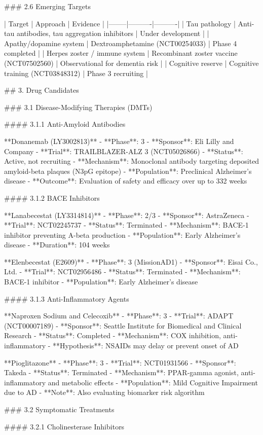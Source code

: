 ### 2.6 Emerging Targets

| Target | Approach | Evidence |
|--------|----------|----------|
| Tau pathology | Anti-tau antibodies, tau aggregation inhibitors | Under development |
| Apathy/dopamine system | Dextroamphetamine (NCT00254033) | Phase 4 completed |
| Herpes zoster / immune system | Recombinant zoster vaccine (NCT07502560) | Observational for dementia risk |
| Cognitive reserve | Cognitive training (NCT03848312) | Phase 3 recruiting |

## 3. Drug Candidates

### 3.1 Disease-Modifying Therapies (DMTs)

#### 3.1.1 Anti-Amyloid Antibodies

**Donanemab (LY3002813)**
- **Phase**: 3
- **Sponsor**: Eli Lilly and Company
- **Trial**: TRAILBLAZER-ALZ 3 (NCT05026866)
- **Status**: Active, not recruiting
- **Mechanism**: Monoclonal antibody targeting deposited amyloid-beta plaques (N3pG epitope)
- **Population**: Preclinical Alzheimer's disease
- **Outcome**: Evaluation of safety and efficacy over up to 332 weeks

#### 3.1.2 BACE Inhibitors

**Lanabecestat (LY3314814)**
- **Phase**: 2/3
- **Sponsor**: AstraZeneca
- **Trial**: NCT02245737
- **Status**: Terminated
- **Mechanism**: BACE-1 inhibitor preventing A-beta production
- **Population**: Early Alzheimer's disease
- **Duration**: 104 weeks

**Elenbecestat (E2609)**
- **Phase**: 3 (MissionAD1)
- **Sponsor**: Eisai Co., Ltd.
- **Trial**: NCT02956486
- **Status**: Terminated
- **Mechanism**: BACE-1 inhibitor
- **Population**: Early Alzheimer's disease

#### 3.1.3 Anti-Inflammatory Agents

**Naproxen Sodium and Celecoxib**
- **Phase**: 3
- **Trial**: ADAPT (NCT00007189)
- **Sponsor**: Seattle Institute for Biomedical and Clinical Research
- **Status**: Completed
- **Mechanism**: COX inhibition, anti-inflammatory
- **Hypothesis**: NSAIDs may delay or prevent onset of AD

**Pioglitazone**
- **Phase**: 3
- **Trial**: NCT01931566
- **Sponsor**: Takeda
- **Status**: Terminated
- **Mechanism**: PPAR-gamma agonist, anti-inflammatory and metabolic effects
- **Population**: Mild Cognitive Impairment due to AD
- **Note**: Also evaluating biomarker risk algorithm

### 3.2 Symptomatic Treatments

#### 3.2.1 Cholinesterase Inhibitors

